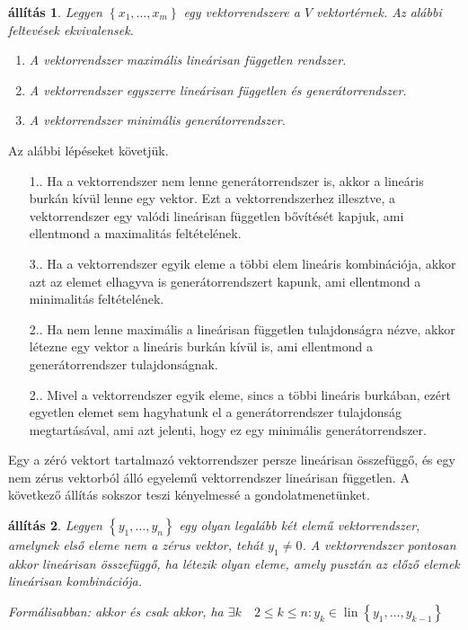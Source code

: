 \documentclass[9pt, showtrims]{memoir}
\makeatletter
\renewenvironment{proof}[1][\proofname]
    {\par\pushQED{\qed}%
    \normalfont \topsep6\p@\@plus6\p@\relax
    \trivlist
    \item[\hskip\labelsep
        \itshape
    #1\@addpunct{:}]\ignorespaces}
    {\popQED\endtrivlist\@endpefalse}
\theoremstyle{plain}
\newtheorem{proposition}{állítás}[section]
\theoremstyle{remark}
\theoremstyle{definition}
\DeclareMathOperator{\lin}{lin}
\makeatother
\begin{document}
\begin{proposition}
    Legyen $\left\{ x_1,\dots,x_m \right\}$ egy vektorrendszere a $V$ vektortérnek.
    Az alábbi feltevések ekvivalensek.
    \begin{enumerate}
        \item A vektorrendszer maximális lineárisan független rendszer.
        \item A vektorrendszer egyszerre lineárisan független és generátorrendszer.
        \item A vektorrendszer minimális generátorrendszer.\qedhere
    \end{enumerate}
\end{proposition}
\begin{proof}
    Az alábbi lépéseket követjük.
    \begin{itemize}
        \item[1.\Rightarrow 2.]
            Ha a vektorrendszer nem lenne generátorrendszer is,
            akkor a lineáris burkán kívül lenne egy vektor.
            Ezt a vektorrendszerhez illesztve, a vektorrendszer egy valódi lineárisan független bővítését kapjuk,
            ami ellentmond a maximalitás feltételének.
        \item[3.\Rightarrow 2.]
            Ha a vektorrendszer egyik eleme a többi elem lineáris kombinációja,
            akkor azt az elemet elhagyva is generátorrendszert kapunk,
            ami ellentmond a minimalitás feltételének.
        \item[2.\Rightarrow 1.]
            Ha nem lenne maximális a lineárisan független tulajdonságra nézve,
            akkor létezne egy vektor a lineáris burkán kívül is,
            ami ellentmond a generátorrendszer tulajdonságnak.
        \item[2.\Rightarrow 3.]
            Mivel a vektorrendszer egyik eleme, sincs a többi lineáris burkában,
            ezért egyetlen elemet sem hagyhatunk el a generátorrendszer tulajdonság megtartásával,
            ami azt jelenti, hogy ez egy minimális generátorrendszer.\qedhere
    \end{itemize}
\end{proof}
Egy a zéró vektort tartalmazó vektorrendszer persze lineárisan összefüggő, 
és egy nem zérus vektorból álló egyelemű vektorrendszer lineárisan független.
A következő állítás sokszor teszi kényelmessé a gondolatmenetünket. 
\begin{proposition}
    Legyen $\left\{ y_1,\dots,y_n \right\}$ egy olyan legalább két elemű vektorrendszer,
    amelynek első eleme nem a zérus vektor, tehát $y_1\neq 0$.
    A vektorrendszer pontosan akkor lineárisan összefüggő,
    ha létezik olyan eleme, 
    amely pusztán az előző elemek lineárisan kombinációja.

    Formálisabban: akkor és csak akkor, 
    ha 
    $\exists k\quad 2\leq k\leq n : y_k\in\lin\left\{ y_1,\dots,y_{k-1} \right\}$
\end{proposition}
\end{document}
